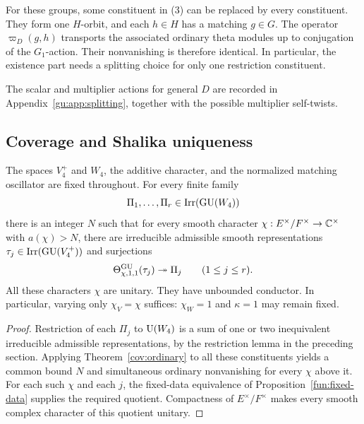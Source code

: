 For these groups, some constituent in (3) can be replaced by
every constituent. They form one \(H\)-orbit, and each \(h\in H\)
has a matching \(g\in G\). The operator \(\varpi_D(g,h)\) transports
the associated ordinary theta modules up to conjugation of the
\(G_1\)-action. Their nonvanishing is therefore identical. In
particular, the existence part needs a splitting choice for only
one restriction constituent.

The scalar and multiplier actions for general $D$ are recorded in
Appendix~\ref{gu:app:splitting}, together with the possible multiplier
self-twists.

\subsection{Coverage and Shalika uniqueness}
\label{cov:gu-section}

\begin{theorem}
\label{cov:gu}\label{gu:asm:coverage}
The spaces $V_4^+$ and $W_4$, the additive character, and the
normalized matching oscillator are fixed throughout. For every finite family
\[
 \Pi_1,\ldots,\Pi_r\in\operatorname{Irr}(\operatorname{GU}(W_4))
\]
there is an integer $N$ such that for every smooth character
$\chi:E^\times/F^\times\to\mathbb C^\times$ with $a(\chi)>N$, there are
irreducible admissible smooth representations
$\tau_j\in\operatorname{Irr}(\operatorname{GU}(V_4^+))$ and surjections
\[
 \Theta^{\operatorname{GU}}_{\chi,1,1}(\tau_j)\twoheadrightarrow\Pi_j
                    \qquad(1\le j\le r).
\]
All these characters $\chi$ are unitary. They have unbounded conductor.
In particular, varying only $\chi_V=\chi$ suffices: $\chi_W=1$ and
$\kappa=1$ may remain fixed. 
\end{theorem}

\begin{proof}
Restriction of each $\Pi_j$ to $\operatorname{U}(W_4)$ is a sum of one or two
inequivalent irreducible admissible representations, by the restriction
lemma in the preceding section. Applying Theorem~\ref{cov:ordinary}
to all these constituents yields a common bound $N$ and simultaneous
ordinary nonvanishing for every $\chi$ above it. For each such $\chi$ and each $j$, the fixed-data equivalence
of Proposition~\ref{fun:fixed-data} supplies the required quotient.
Compactness of $E^\times/F^\times$ makes every smooth complex character
of this quotient unitary. 
\end{proof}

